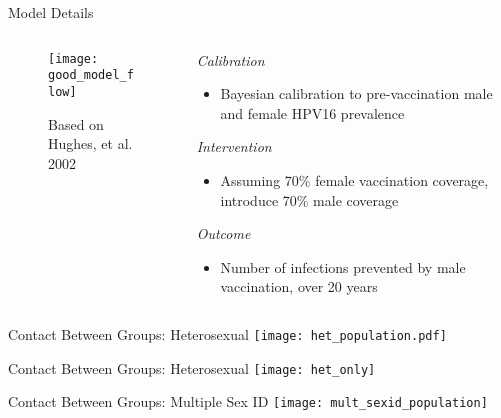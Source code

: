 \documentclass[aspectratio=169]{beamer}
\begin{document}
\begin{frame}{Model Details}
    \begin{columns}[T]
    \begin{column}{0.5\textwidth}
        \begin{figure}
            \texttt{[image: good\_model\_flow]}
            \caption{\scriptsize{Based on Hughes, et al. 2002}}
        \end{figure}
    \end{column}
    \begin{column}{0.5\textwidth}
    \emph{Calibration}
    \pause
        \begin{itemize}
        \item Bayesian calibration to pre-vaccination male  and female HPV16 prevalence
        \end{itemize}
    \pause
    \medskip
    \emph{Intervention}
    \pause
    \begin{itemize}
        \item Assuming 70\% female vaccination coverage, introduce 70\% male coverage
    \end{itemize}
    \medskip
    \pause
    \emph{Outcome}
    \pause
    \begin{itemize}
        \item Number of infections prevented by male vaccination,  over 20 years
    \end{itemize}
    \end{column}
    \end{columns}
\end{frame}

\begin{frame}{Contact Between Groups: Heterosexual} 
    \vspace{2cm}
    \centering
    \texttt{[image: het\_population.pdf]}
\end{frame}

\begin{frame}{Contact Between Groups: Heterosexual}
    \centering
    \texttt{[image: het\_only]}
\end{frame}

\begin{frame}{Contact Between Groups: Multiple Sex ID}
    \centering
    \texttt{[image: mult\_sexid\_population]}
\end{frame}
\end{document}
